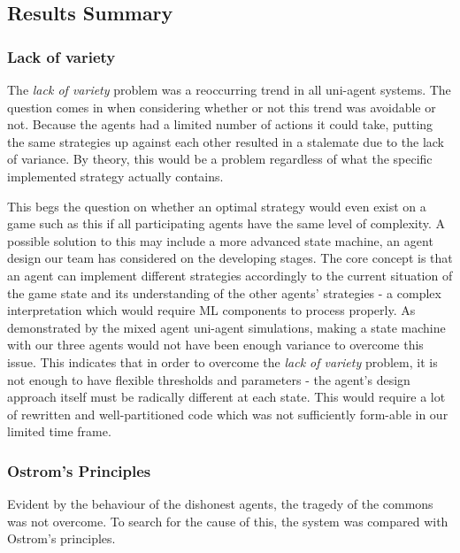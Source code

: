 \subsection{Results Summary} \label{ResultSummary}
\subsubsection{Lack of variety}
The \emph{lack of variety} problem was a reoccurring trend in all uni-agent systems. The question comes in when considering whether or not this trend was avoidable or not. Because the agents had a limited number of actions it could take, putting the same strategies up against each other resulted in a stalemate due to the lack of variance. By theory, this would be a problem regardless of what the specific implemented strategy actually contains.

This begs the question on whether an optimal strategy would even exist on a game such as this if all participating agents have the same level of complexity. A possible solution to this may include a more advanced state machine, an agent design our team has considered on the developing stages. The core concept is that an agent can implement different strategies accordingly to the current situation of the game state and its understanding of the other agents' strategies - a complex interpretation which would require ML components to process properly. As demonstrated by the mixed agent uni-agent simulations, making a state machine with our three agents would not have been enough variance to overcome this issue. This indicates that in order to overcome the \emph{lack of variety} problem, it is not enough to have flexible thresholds and parameters - the agent's design approach itself must be radically different at each state. This would require a lot of rewritten and well-partitioned code which was not sufficiently form-able in our limited time frame.

\subsubsection{Ostrom's Principles}
Evident by the behaviour of the dishonest agents, the tragedy of the commons was not overcome. To search for the cause of this, the system was compared with Ostrom’s principles.

